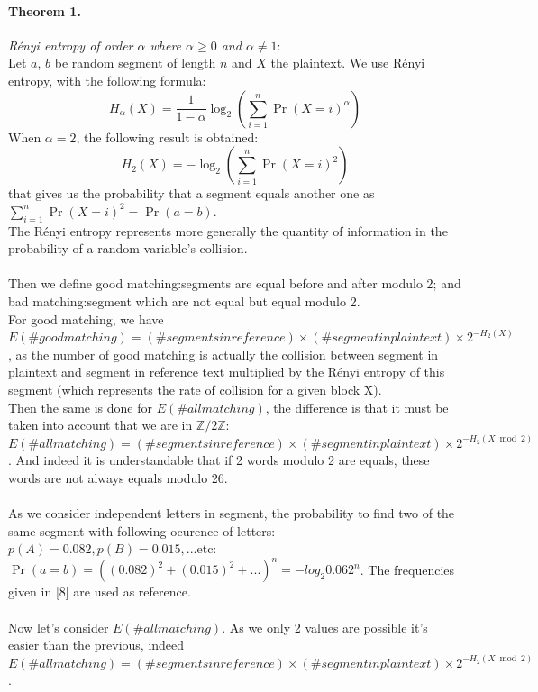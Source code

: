 \documentclass{article}
\begin{document}
\paragraph{Theorem 1.}\textit{R\'enyi entropy of order $\alpha$ where $\alpha \geq 0$ and $\alpha \neq 1$}:
\\
Let $a$, $b$ be random segment of length $n$ and $X$ the plaintext. We use R\'enyi entropy, with the following formula:\\
$$H_{\alpha}(X) = \frac{1}{1-\alpha}\log_{2}(\sum_{i=1}^{n}{\Pr(X=i)^{\alpha}})$$ 
When $\alpha = 2$, the following result is obtained:
$$H_{2}(X) = -\log_{2}(\sum_{i=1}^{n}{\Pr(X=i)^{2}})$$ that gives us the probability that a segment equals another one as $\sum_{i=1}^{n}{\Pr(X=i)^{2}} =\Pr(a=b)$.\\
The R\'enyi entropy represents more generally the quantity of information in the probability of a random variable's collision.\\
\\
Then we define good matching:segments are equal before and after modulo 2; and bad matching:segment which are not equal but equal modulo 2.\\
${}$\hspace{1em}For good matching, we have $E(\# good matching) = (\# segments in reference) \times (\#segment in plaintext) \times 2^{-H_{2}(X)}$, as the number of good matching is actually the collision between segment in plaintext and segment in reference text multiplied by the R\'enyi entropy of this segment (which represents the rate of collision for a given block X).\\
Then the same is done for  $E(\# all matching)$, the difference is that it must be taken into account that we are in $\mathbb{Z}/2\mathbb{Z}$:$E(\# all matching) = (\# segments in reference) \times (\#segment in plaintext) \times 2^{-H_{2}(X \bmod 2)}$ . And indeed it is understandable that if 2 words modulo 2 are equals, these words are not always equals modulo 26.\\
\\
As we consider independent letters in segment, the probability to find two of the same segment with following ocurence of letters:$p(A)=0.082, p(B)=0.015,...$etc:$\Pr(a=b)=((0.082)^{2} +(0.015)^{2} + ...)^{n} = -log_{2}0.062^{n}$. The frequencies given in [8] are used as reference.\\
\\
${}$\hspace{1em}Now let's consider $E(\# all matching)$. As we only 2 values are possible it's easier than the previous, indeed $E(\# all matching) =(\# segments in reference) \times (\#segment in plaintext) \times 2^{-H_{2}(X \bmod 2)}$.\\
\end{document}
